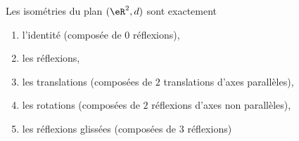 \begin{theorem}      \label{THOooVRNOooAgaVRN}
    Les isométries du plan \( (\eR^2,d)\) sont exactement
    \begin{enumerate}
        \item
            l'identité (composée de \( 0\) réflexions),
        \item
            les réflexions,
        \item
            les translations (composées de \( 2\) translations d'axes parallèles),
        \item
            les rotations (composées de \( 2\) réflexions d'axes non parallèles),
        \item
            les réflexions glissées (composées de \( 3\) réflexions)
    \end{enumerate}
\end{theorem}

